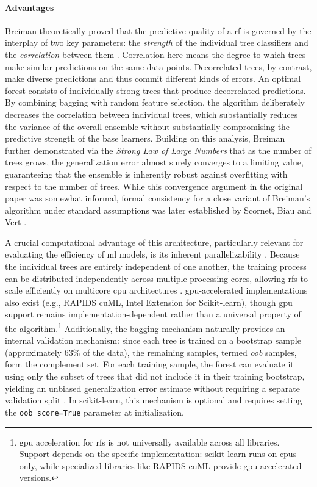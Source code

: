 \paragraph{Advantages}
Breiman theoretically proved that the predictive quality of a \gls{rf} is governed by the interplay of two key parameters: the \textit{strength} of the individual tree classifiers and the \textit{correlation} between them \parencite{breimanRandomForests2001}. Correlation here means the degree to which trees make similar predictions on the same data points. Decorrelated trees, by contrast, make diverse predictions and thus commit different kinds of errors. An optimal forest consists of individually strong trees that produce decorrelated predictions. By combining bagging with random feature selection, the algorithm deliberately decreases the correlation between individual trees, which substantially reduces the variance of the overall ensemble without substantially compromising the predictive strength of the base learners. Building on this analysis, Breiman \parencite{breimanRandomForests2001} further demonstrated via the \textit{Strong Law of Large Numbers} that as the number of trees grows, the generalization error almost surely converges to a limiting value, guaranteeing that the ensemble is inherently robust against overfitting with respect to the number of trees. While this convergence argument in the original paper was somewhat informal, formal consistency for a close variant of Breiman's algorithm under standard assumptions was later established by Scornet, Biau and Vert \parencite{scornetConsistencyRandomForests2014}.

A crucial computational advantage of this architecture, particularly relevant for evaluating the efficiency of \gls{ml} models, is its inherent parallelizability \parencite{biauRandomForestGuided2016}. Because the individual trees are entirely independent of one another, the training process can be distributed independently across multiple processing cores, allowing \glspl{rf} to scale efficiently on multicore \gls{cpu} architectures \parencite{breimanRandomForests2001, biauRandomForestGuided2016}. \gls{gpu}-accelerated implementations also exist (e.g., RAPIDS cuML, Intel Extension for Scikit-learn), though \gls{gpu} support remains implementation-dependent rather than a universal property of the algorithm.\footnote{\gls{gpu} acceleration for \glspl{rf} is not universally available across all libraries. Support depends on the specific implementation: scikit-learn runs on \glspl{cpu} only, while specialized libraries like RAPIDS cuML provide \gls{gpu}-accelerated versions.} Additionally, the bagging mechanism naturally provides an internal validation mechanism: since each tree is trained on a bootstrap sample (approximately 63\% of the data), the remaining samples, termed \textit{\gls{oob}} samples, form the complement set. For each training sample, the forest can evaluate it using only the subset of trees that did not include it in their training bootstrap, yielding an unbiased generalization error estimate without requiring a separate validation split \parencite{breimanRandomForests2001}. In scikit-learn, this mechanism is optional and requires setting the \texttt{oob\_score=True} parameter at initialization.

